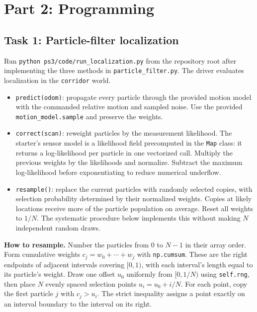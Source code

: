 \documentclass[11pt]{article}
\begin{document}
\clearpage
\section{Part 2: Programming}

\subsection{Task 1: Particle-filter localization}

Run \texttt{python ps3/code/run\_localization.py} from the repository root
after implementing the three methods in \texttt{particle\_filter.py}.
The driver evaluates localization in the \texttt{corridor} world.

\begin{itemize}
\item \texttt{predict(odom)}: propagate every particle through the provided
      motion model with the commanded relative motion and sampled noise. Use the provided \texttt{motion\_model.sample} and preserve the weights.
\item \texttt{correct(scan)}: reweight particles by the measurement
      likelihood. The starter's sensor model is a likelihood field
      precomputed in the \texttt{Map} class: it returns a log-likelihood per
      particle in one vectorized call. Multiply the previous weights by
      the likelihoods and normalize. Subtract the maximum log-likelihood
      before exponentiating to reduce numerical underflow.
\item \texttt{resample()}: replace the current particles with randomly
      selected copies, with selection probability determined by their
      normalized weights. Copies at likely locations receive more of
      the particle population on average. Reset all weights to $1/N$.
      The systematic procedure below implements this without making
      $N$ independent random draws.
\end{itemize}

\textbf{How to resample.} Number the particles from $0$ to $N-1$ in their
array order. Form cumulative weights
$c_j=w_0+\cdots+w_j$ with \texttt{np.cumsum}. These are the right
endpoints of adjacent intervals covering $[0,1)$, with each interval's
length equal to its particle's weight. Draw one offset $u_0$ uniformly
from $[0,1/N)$ using \texttt{self.rng}, then place $N$ evenly spaced
selection points $u_i=u_0+i/N$. For each point, copy the first particle
$j$ with $c_j>u_i$. The strict inequality assigns a point exactly on an
interval boundary to the interval on its right.
\end{document}

